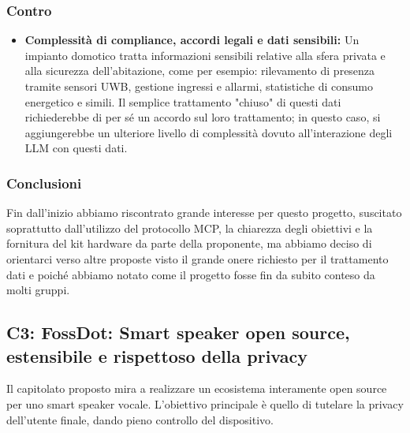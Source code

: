 \subsubsection{Contro}
\begin{itemize}
    \item \textbf{Complessità di compliance, accordi legali e dati sensibili:} Un impianto domotico tratta informazioni sensibili relative alla sfera privata e alla sicurezza dell'abitazione, come per esempio: rilevamento di presenza tramite sensori UWB, gestione ingressi e allarmi, statistiche di consumo energetico e simili. Il semplice trattamento "chiuso" di questi dati richiederebbe di per sé un accordo sul loro trattamento; in questo caso, si aggiungerebbe un ulteriore livello di complessità dovuto all'interazione degli LLM con questi dati.
    
\end{itemize}

\subsubsection{Conclusioni}
Fin dall'inizio abbiamo riscontrato grande interesse per questo progetto, suscitato soprattutto dall'utilizzo del protocollo MCP, la chiarezza degli obiettivi e la fornitura del kit hardware da parte della proponente, ma abbiamo deciso di orientarci verso altre proposte visto il grande onere richiesto per il trattamento dati e poiché abbiamo notato come il progetto fosse fin da subito conteso da molti gruppi.

\subsection{C3: FossDot: Smart speaker open source, estensibile e rispettoso della privacy}

Il capitolato proposto mira a realizzare un ecosistema interamente open source per uno smart speaker vocale. L'obiettivo principale è quello di tutelare la privacy dell'utente finale, dando pieno controllo del dispositivo.

